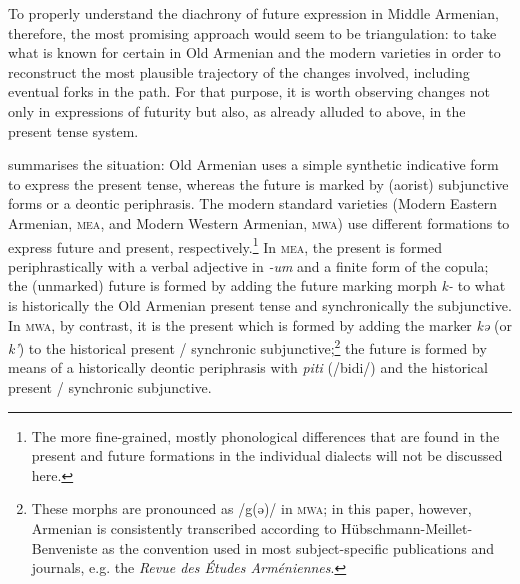 \documentclass[output=paper,colorlinks,citecolor=brown]{langscibook}
\begin{document}
	To properly understand the diachrony of future expression in Middle Armenian, therefore, the most promising approach would seem to be triangulation: to take what is known for certain in Old Armenian and the modern varieties in order to reconstruct the most plausible trajectory of the changes involved, including eventual forks in the path. For that purpose, it is worth observing changes not only in expressions of futurity but also, as already alluded to above, in the present tense system.
	
	 summarises the situation: Old Armenian uses a simple synthetic indicative form to express the present tense, whereas the future is marked by (aorist) subjunctive forms or a deontic periphrasis. The modern standard varieties (Modern Eastern Armenian, \textsc{\textsc{mea}}, and Modern Western Armenian, \textsc{\textsc{mwa}}) use different formations to express future and present, respectively.\footnote{The more fine-grained, mostly phonological differences that are found in the present and future formations in the individual dialects will not be discussed here.} In \textsc{\textsc{mea}}, the present is formed periphrastically with a verbal adjective in \textit{-um} and a finite form of the copula; the (unmarked) future is formed by adding the future marking morph \textit{k-} to what is historically the Old Armenian present tense and synchronically the subjunctive. In \textsc{\textsc{mwa}}, by contrast, it is the present which is formed by adding the marker \textit{kə} (or \textit{k'}) to the historical present / synchronic subjunctive;\footnote{These morphs are pronounced as /g(ə)/ in \textsc{\textsc{mwa}}; in this paper, however, Armenian is consistently transcribed according to Hübschmann-Meillet-Benveniste as the convention used in most subject-specific publications and journals, e.g. the \textit{Revue des Études Arméniennes}.} the future is formed by means of a historically deontic periphrasis with \textit{piti} (/bidi/) and the historical present / synchronic subjunctive.
	
\end{document}
